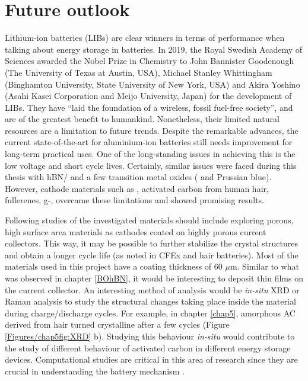 \section{Future outlook}
Lithium-ion batteries (LIBs) are clear winners in terms of performance when talking about energy storage in batteries. In 2019, the Royal Swedish Academy of Sciences awarded the Nobel Prize in Chemistry to John Bannister Goodenough (The University of Texas at Austin, USA), Michael Stanley Whittingham (Binghamton University, State University of New York, USA) and Akira Yoshino (Asahi Kasei Corporation and Meijo University, Japan) for the development of LIBs. They have \enquote{laid the foundation of a wireless, fossil fuel-free society}, and are of the greatest benefit to humankind. Nonetheless, their limited natural resources are a limitation to future trends. 
Despite the remarkable advances, the current state-of-the-art for aluminium-ion batteries still needs improvement for long-term practical uses. One of the long-standing issues in achieving this is the low voltage and short cycle lives. Certainly, similar issues were faced during this thesis with hBN/ and a few transition metal oxides ( and Prussian blue). However, cathode materials such as \cite{divya_molybdenum_2019}, activated carbon from human hair, fullerenes, g-,  overcame these limitations and showed promising results. 

Following studies of the investigated materials should include exploring porous, high surface area materials as cathodes coated on highly porous current collectors. This way, it may be possible to further stabilize the crystal structures and obtain a longer cycle life (as noted in CFEx and hair batteries). Most of the materials used in this project have a coating thickness of 60 $\mu$m. Similar to what was observed in chapter \ref{BOhBN}, it would be interesting to deposit thin films on the current collector. An interesting method of analysis would be \textit{in-situ} XRD or Raman analysis to study the structural changes taking place inside the material during charge/discharge cycles. For example, in chapter \ref{chap5}, amorphous AC derived from hair turned crystalline after a few cycles (Figure \ref{Figures/chap5fig:XRD} b). Studying this behaviour \textit{in-situ} would contribute to the study of different behaviour of activated carbon in different energy storage devices. Computational studies are critical in this area of research since they are crucial in understanding the battery mechanism \cite{bhauriyal_computational_2017,gao_understanding_2017,bhauriyal_staging_2017,agiorgousis_role_2017}. 

